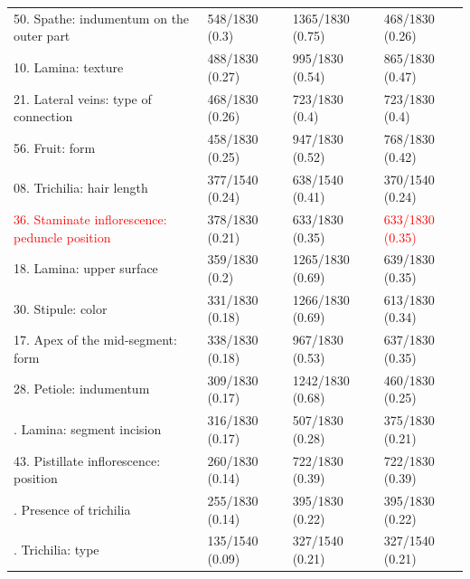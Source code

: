\documentclass[a4paper]{article}
\theoremstyle{definition}
\theoremstyle{definition}
\theoremstyle{definition}
\theoremstyle{remark}
\begin{document}
\begin{longtable}[t]{>{\raggedright\arraybackslash}p{25em}lll}
\textcolor[HTML]{0072ff}{50. Spathe: indumentum on the outer part} & \textcolor[HTML]{0072ff}{548/1830 (0.3)} & \textcolor[HTML]{0072ff}{1365/1830 (0.75)} & \textcolor[HTML]{0072ff}{468/1830 (0.26)}\\
\textcolor[HTML]{0072ff}{10. Lamina: texture} & \textcolor[HTML]{0072ff}{488/1830 (0.27)} & \textcolor[HTML]{0072ff}{995/1830 (0.54)} & \textcolor[HTML]{0072ff}{865/1830 (0.47)}\\
\addlinespace
\textcolor[HTML]{0072ff}{21. Lateral veins: type of connection} & \textcolor[HTML]{0072ff}{468/1830 (0.26)} & \textcolor[HTML]{0072ff}{723/1830 (0.4)} & \textcolor[HTML]{0072ff}{723/1830 (0.4)}\\
\textcolor[HTML]{0a7502}{56. Fruit: form} & 458/1830 (0.25) & \textcolor[HTML]{0a7502}{947/1830 (0.52)} & \textcolor[HTML]{0a7502}{768/1830 (0.42)}\\
\textcolor[HTML]{0a7502}{08. Trichilia: hair length} & 377/1540 (0.24) & \textcolor[HTML]{0a7502}{638/1540 (0.41)} & 370/1540 (0.24)\\
\textcolor{red}{36. Staminate inflorescence: peduncle position} & 378/1830 (0.21) & 633/1830 (0.35) & \textcolor{red}{633/1830 (0.35)}\\
\textcolor[HTML]{0a7502}{18. Lamina: upper surface} & 359/1830 (0.2) & \textcolor[HTML]{0a7502}{1265/1830 (0.69)} & \textcolor[HTML]{0a7502}{639/1830 (0.35)}\\
\addlinespace
\textcolor[HTML]{0a7502}{30. Stipule: color} & 331/1830 (0.18) & \textcolor[HTML]{0a7502}{1266/1830 (0.69)} & \textcolor[HTML]{0a7502}{613/1830 (0.34)}\\
\textcolor[HTML]{0a7502}{17. Apex of the mid-segment: form} & 338/1830 (0.18) & \textcolor[HTML]{0a7502}{967/1830 (0.53)} & \textcolor[HTML]{0a7502}{637/1830 (0.35)}\\
\textcolor[HTML]{0a7502}{28. Petiole: indumentum} & 309/1830 (0.17) & \textcolor[HTML]{0a7502}{1242/1830 (0.68)} & \textcolor[HTML]{0a7502}{460/1830 (0.25)}\\
12. Lamina: segment incision & 316/1830 (0.17) & 507/1830 (0.28) & 375/1830 (0.21)\\
\textcolor[HTML]{0a7502}{43. Pistillate inflorescence: position} & 260/1830 (0.14) & \textcolor[HTML]{0a7502}{722/1830 (0.39)} & \textcolor[HTML]{0a7502}{722/1830 (0.39)}\\
\addlinespace
01. Presence of trichilia & 255/1830 (0.14) & 395/1830 (0.22) & 395/1830 (0.22)\\
04. Trichilia: type & 135/1540 (0.09) & 327/1540 (0.21) & 327/1540 (0.21)\\

\end{longtable}
\end{document}
